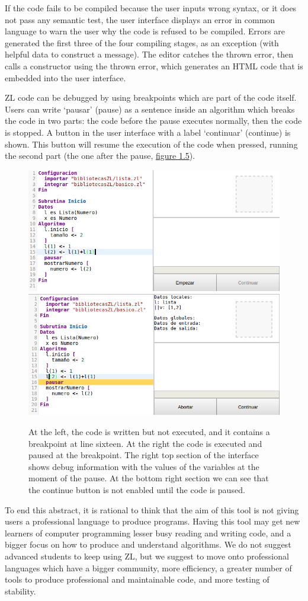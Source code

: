 \documentclass{report}
\begin{document}
	If the code fails to be compiled because the user inputs wrong syntax, or it does not pass any semantic test, the user interface displays an error in common language to warn the user why the code is refused to be compiled. Errors are generated the first three of the four compiling stages, as an exception (with helpful data to construct a message). The editor catches the thrown error, then calls a constructor using the thrown error, which generates an HTML code that is embedded into the user interface. 
	
	ZL code can be debugged by using breakpoints which are part of the code itself. Users can write `pausar' (pause) as a sentence inside an algorithm  which breaks the code in two parts: the code before the pause executes normally, then the code is stopped. A button in the user interface with a label `continuar' (continue) is shown. This button will resume the execution of the code when pressed, running the second part (the one after the pause, \hyperref[fig:pausa]{figure 1.5}).  
	
\begin{figure}
\centering
\includegraphics[width=0.48\linewidth]{pausa1}
\includegraphics[width=0.48\linewidth]{pausa2}
\caption[Breakpoint: pause example.]{At the left, the code is written but not executed, and it contains a breakpoint at line sixteen. At the right the code is executed and paused at the breakpoint. The right top section of the interface shows debug information with the values of the variables at the moment of the pause. At the bottom right section we can see that the continue button is not enabled until the code is paused.}
\label{fig:pausa}
\end{figure}

	To end this abstract, it is rational to think that the aim of this tool is not giving users a professional language to produce programs. Having this tool may get new learners of computer programming lesser busy reading and writing code, and a bigger focus on how to produce and understand algorithms. We do not suggest advanced students to keep using ZL, but we suggest to move onto professional languages which have a bigger community, more efficiency, a greater number of tools to produce professional and maintainable code, and more testing of stability. 
\end{document}
